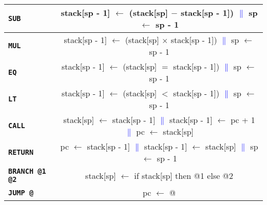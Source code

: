 \documentclass[12pt]{article}
\begin{document}
\begin{landscape}
\begin{center}
\begin{tabular}{|l||c|}
\hline
\textbf{\texttt{SUB}} & stack[sp - 1] $\leftarrow$ (stack[sp] $-$ stack[sp - 1]) \textcolor{blue}{$\|$} sp $\leftarrow$ sp - 1\\
\hline
\textbf{\texttt{MUL}} & stack[sp - 1] $\leftarrow$ (stack[sp] $\times$ stack[sp - 1]) \textcolor{blue}{$\|$} sp $\leftarrow$ sp - 1\\
\hline
\textbf{\texttt{EQ}} & stack[sp - 1] $\leftarrow$ (stack[sp] $=$ stack[sp - 1]) \textcolor{blue}{$\|$} sp $\leftarrow$ sp - 1\\
\hline
\textbf{\texttt{LT}} & stack[sp - 1] $\leftarrow$ (stack[sp] $<$ stack[sp - 1]) \textcolor{blue}{$\|$} sp $\leftarrow$ sp - 1\\
\hline
\textbf{\texttt{CALL}} & stack[sp] $\leftarrow$ stack[sp - 1] \textcolor{blue}{$\|$} stack[sp - 1] $\leftarrow$ pc + 1 \textcolor{blue}{$\|$} pc $\leftarrow$ stack[sp]\\
\hline
\textbf{\texttt{RETURN}} & pc $\leftarrow$ stack[sp - 1] \textcolor{blue}{$\|$} stack[sp - 1] $\leftarrow$ stack[sp] \textcolor{blue}{$\|$} sp $\leftarrow$ sp - 1\\
\hline
\textbf{\texttt{BRANCH @1 @2}} & stack[sp] $\leftarrow$ if stack[sp] then @1 else @2\\
\hline
\textbf{\texttt{JUMP @}} & pc $\leftarrow$ @\\
\hline

\end{tabular}
\end{center}

\end{landscape}
\end{document}
